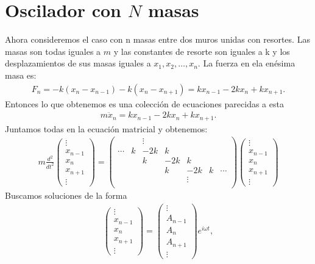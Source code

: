 \documentclass[letterpaper,12pt,oneside]{book}
\begin{document}
\section{Oscilador con $N$ masas}
Ahora consideremos el caso con n masas entre dos muros unidas con resortes. Las masas son todas iguales a $m$ y las constantes de resorte son iguales a k y los desplazamientos de sus masas iguales a $x_1,x_2,\dots,x_n$. La fuerza en ela en\'esima masa es: 
%
\begin{eqnarray}
F_n = -k(x_n - x_{n-1}) - k(x_n-x_{n+1})= kx_{n-1} - 2kx_n+kx_{n+1}.
\end{eqnarray}
%
Entonces lo que obtenemos es una colecci\'on de ecuaciones parecidas a esta
%
\begin{eqnarray}
m \ddot x_n = kx_{n-1}-2kx_n+kx_{n+1}\label{enesima}.
\end{eqnarray}
%
Juntamos todas en la ecuaci\'on matricial y obtenemos:
%
\begin{eqnarray}m\frac{d^2}{dt^2}
\begin{pmatrix}
\vdots\\
x_{n-1}\\
x_n\\
x_{n+1} \\
\vdots
\end{pmatrix} = \begin{pmatrix}
 & & \vdots \\
\cdots & k & -2k & k\\
 & & k & -2k & k\\
  & & & k & -2k & k & \cdots\\
  & & & & \vdots \\
\end{pmatrix}\begin{pmatrix}
\vdots\\
x_{n-1}\\
x_n\\
x_{n+1} \\
\vdots
\end{pmatrix}
\end{eqnarray}
%
Buscamos soluciones de la forma
%
\begin{eqnarray}
\begin{pmatrix}
\vdots\\
x_{n-1}\\
x_n\\
x_{n+1} \\
\vdots
\end{pmatrix} = \begin{pmatrix}
\vdots\\
A_{n-1}\\
A_n\\
A_{n+1} \\
\vdots
\end{pmatrix}e^{i\omega t},
\end{eqnarray}
\end{document}
